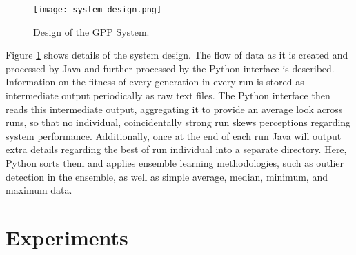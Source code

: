 \documentclass[12pt, letterpaper]{article}
\begin{document}
\begin{figure}[!htbp]
\begin{center}
\texttt{[image: system\_design.png]}
\end{center}
\caption{Design of the GPP System.}
\label{fig:system}
\end{figure}

\textrm{ \indent Figure \ref{fig:system} shows details of the system design. The flow of data as it is created and processed by Java and further processed by the Python interface is described. Information on the fitness of every generation in every run is stored as intermediate output periodically as raw text files. The Python interface then reads this intermediate output, aggregating it to provide an average look across runs, so that no individual, coincidentally strong run skews perceptions regarding system performance. Additionally, once at the end of each run Java will output extra details regarding the best of run individual into a separate directory. Here, Python sorts them and applies ensemble learning methodologies, such as outlier detection in the ensemble, as well as simple average, median, minimum, and maximum data. }

%
%
% 
%
%
%

\newpage

\section{Experiments}
\end{document}
